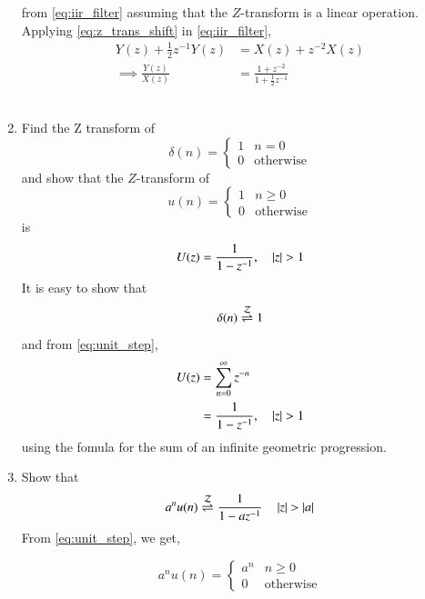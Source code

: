 \documentclass[journal,12pt,twocolumn]{IEEEtran}
\renewcommand\thesection{\arabic{section}}
\begin{document}
\begin{enumerate}[label=\thesection.\arabic*,ref=\thesection.\theenumi]
from  \eqref{eq:iir_filter} assuming that the $Z$-transform is a linear operation.\\
\solution  Applying \eqref{eq:z_trans_shift} in \eqref{eq:iir_filter},
\begin{align}
Y\left(z\right) + \frac{1}{2}z^{-1}Y(z) &= X(z)+z^{-2}X(z)
\\
\implies \frac{Y(z)}{X(z)} &= \frac{1 + z^{-2}}{1 + \frac{1}{2}z^{-1}}
\label{eq:freq_resp}
\end{align}
\ \\


\item Find the Z transform of 
\begin{equation}
\delta(n)
=
\begin{cases}
1 & n = 0
\\
0 & \text{otherwise}
\end{cases}
\end{equation}
and show that the $Z$-transform of
\begin{equation}
\label{eq:unit_step}
u(n)
=
\begin{cases}
1 & n \ge 0
\\
0 & \text{otherwise}
\end{cases}
\end{equation}
is
\begin{equation}
U(z) = \frac{1}{1-z^{-1}}, \quad \left\vert z\right\vert > 1
\end{equation}
\solution It is easy to show that
\begin{equation}
\delta(n) \overset{\mathcal{Z}}{ \rightleftharpoons} 1
\end{equation}
and from \eqref{eq:unit_step},
\begin{align}
U(z) &= \sum _{n= 0}^{\infty}z^{-n}
\\
&=\frac{1}{1-z^{-1}}, \quad \left\vert z\right\vert > 1
\end{align}
using the fomula for the sum of an infinite geometric progression.\\

\item Show that 
\begin{equation}
\label{eq:anun}
a^nu(n) \overset{\mathcal{Z}}{ \rightleftharpoons} \frac{1}{1-az^{-1}} \quad \left\vert z\right\vert > \left\vert a\right\vert
\end{equation}
\solution From \eqref{eq:unit_step}, we get,

\begin{equation}
\label{eq:anuncs}
a^nu(n)
=
\begin{cases}
a^n & n \ge 0
\\
0 & \text{otherwise}
\end{cases}
\end{equation}


\end{enumerate}
\end{document}
